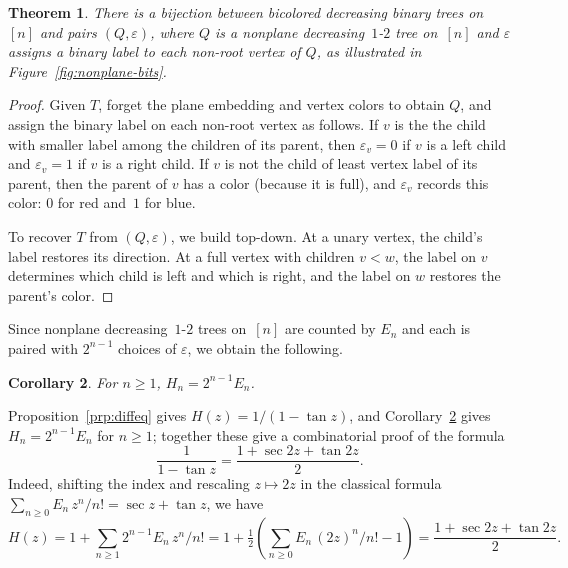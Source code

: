 \documentclass[10pt]{article}
\theoremstyle{plain}
\newtheorem{theorem}{Theorem}[section]
\newtheorem{corollary}[theorem]{Corollary}
\begin{document}
\begin{theorem}
\label{thm:bijection-nonplane}
There is a bijection between bicolored decreasing binary trees on~$[n]$ and pairs $(Q, \varepsilon)$, where $Q$ is a nonplane decreasing~$1$-$2$ tree on~$[n]$ and $\varepsilon$ assigns a binary label to each non-root vertex of $Q$, as illustrated in Figure~\ref{fig:nonplane-bits}.
\end{theorem}

\begin{proof}
Given $T$, forget the plane embedding and vertex colors to obtain $Q$, and assign the binary label on each non-root vertex as follows. If $v$ is the the child with smaller label among the children of its parent, then $\varepsilon_v = 0$ if $v$ is a left child and $\varepsilon_v = 1$ if $v$ is a right child. If $v$ is not the child of least vertex label of its parent, then the parent of $v$ has a color (because it is full), and $\varepsilon_v$ records this color: $0$ for red and~$1$ for blue.

To recover $T$ from $(Q, \varepsilon)$, we build top-down. At a unary vertex, the child's label restores its direction. At a full vertex with children $v < w$, the label on $v$ determines which child is left and which is right, and the label on $w$ restores the parent's color.
\end{proof}

Since nonplane decreasing~$1$-$2$ trees on~$[n]$ are counted by $E_n$ and each is paired with $2^{n-1}$ choices of $\varepsilon$, we obtain the following.

\begin{corollary}
\label{cor:euler}
For $n \geq 1$, $H_n = 2^{n-1} E_n$.
\end{corollary}

Proposition~\ref{prp:diffeq} gives $H(z) = 1/(1-\tan z)$, and Corollary~\ref{cor:euler} gives $H_n = 2^{n-1} E_n$ for $n \geq 1$; together these give a combinatorial proof of the formula
\[
	\frac{1}{1 - \tan z} = \frac{1 + \sec 2z + \tan 2z}{2}.
\]
Indeed, shifting the index and rescaling $z \mapsto 2z$ in the classical formula $\sum_{n \geq 0} E_n\, z^n/n! = \sec z + \tan z$, we have
\[
	H(z) = 1 + \sum_{n \geq 1} 2^{n-1} E_n\, z^n/n! = 1 + \tfrac{1}{2}\!\left(\sum_{n \geq 0} E_n\, (2z)^n/n! - 1\right) = \frac{1 + \sec 2z + \tan 2z}{2}.
\]

\end{document}
